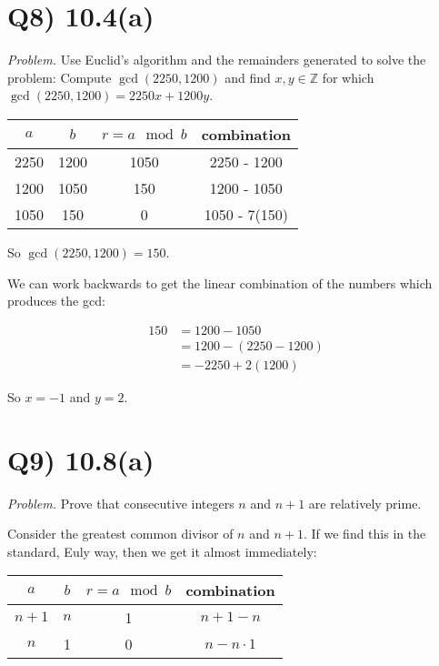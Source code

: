 \documentclass{article}
\begin{document}
\section*{Q8) 10.4(a)}

\textit{Problem.} Use Euclid's algorithm and the remainders generated to solve the problem: Compute $\gcd(2250, 1200)$ and find $x, y \in \mathbb{Z}$ for which $\gcd(2250,1200) = 2250x + 1200y$.


\begin{table}[h!]
  \centering
  \begin{tabular} {c c | c c}
    $a$ & $b$ & $r = a\mod b$ & combination \\ [0.5ex]
    \hline
    2250 & 1200 & 1050 & 2250 - 1200 \\
    1200 & 1050 & 150 & 1200 - 1050\\
    1050 & 150 & 0 & 1050 - 7(150) \\
  \end{tabular}
\end{table}

So $\gcd(2250,1200) = 150$.

We can work backwards to get the linear combination of the numbers which produces the gcd:

\begin{align*}
  150 &= 1200 - 1050 \\
  &= 1200 - (2250 - 1200) \\
  &= -2250 + 2(1200)
\end{align*}

So $x = -1$ and $y=2$. 



\section*{Q9) 10.8(a)}

\textit{Problem.} Prove that consecutive integers $n$ and $n+1$ are relatively prime.

Consider the greatest common divisor of $n$ and $n+1$. If we find this in the standard, Euly way, then we get it almost immediately:

\begin{table}[h!]
  \centering
  \begin{tabular} {c c | c c}
    $a$ & $b$ & $r = a\mod b$ & combination \\ [0.5ex]
    \hline
    $n+1$ & $n$ & 1 & $n+1 - n$ \\
    $n$ & 1 & 0 & $n - n\cdot1$\\
  \end{tabular}
\end{table}
\end{document}
